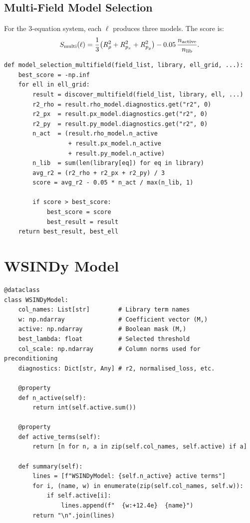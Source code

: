\documentclass[11pt]{article}
\begin{document}
\subsection{Multi-Field Model Selection}

For the 3-equation system, each $\ell$ produces three models.
The score is:
\begin{equation}
  S_{\rm multi}(\ell) = \frac{1}{3}\bigl(R^2_\rho + R^2_{p_x} + R^2_{p_y}\bigr)
  - 0.05\,\frac{n_{\rm active}}{n_{\rm lib}}.
\end{equation}

\begin{lstlisting}[caption={multifield.py --- model\_selection\_multifield}]
def model_selection_multifield(field_list, library, ell_grid, ...):
    best_score = -np.inf
    for ell in ell_grid:
        result = discover_multifield(field_list, library, ell, ...)
        r2_rho = result.rho_model.diagnostics.get("r2", 0)
        r2_px  = result.px_model.diagnostics.get("r2", 0)
        r2_py  = result.py_model.diagnostics.get("r2", 0)
        n_act  = (result.rho_model.n_active
                  + result.px_model.n_active
                  + result.py_model.n_active)
        n_lib  = sum(len(library[eq]) for eq in library)
        avg_r2 = (r2_rho + r2_px + r2_py) / 3
        score = avg_r2 - 0.05 * n_act / max(n_lib, 1)

        if score > best_score:
            best_score = score
            best_result = result
    return best_result, best_ell
\end{lstlisting}


\section{WSINDy Model}
\label{sec:model}

\begin{lstlisting}[caption={model.py --- WSINDyModel dataclass}]
@dataclass
class WSINDyModel:
    col_names: List[str]        # Library term names
    w: np.ndarray               # Coefficient vector (M,)
    active: np.ndarray          # Boolean mask (M,)
    best_lambda: float          # Selected threshold
    col_scale: np.ndarray       # Column norms used for preconditioning
    diagnostics: Dict[str, Any] # r2, normalised_loss, etc.

    @property
    def n_active(self):
        return int(self.active.sum())

    @property
    def active_terms(self):
        return [n for n, a in zip(self.col_names, self.active) if a]

    def summary(self):
        lines = [f"WSINDyModel: {self.n_active} active terms"]
        for i, (name, w) in enumerate(zip(self.col_names, self.w)):
            if self.active[i]:
                lines.append(f"  {w:+12.4e}  {name}")
        return "\n".join(lines)
\end{lstlisting}
\end{document}
